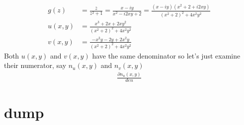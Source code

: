 \documentclass{article}
\begin{document}
		\begin{align*}
			g(z) &= \frac{\bar{z}}{z^2+1} = \frac{x-iy}{x^2 -i2xy + 2} = \frac{(x-iy)(x^2+2 +i2xy)}{(x^2+2 )^2 + 4x^2y^2}\\
			u(x,y) &= \frac{x^3 +2x + 2xy^2}{(x^2+2 )^2 + 4x^2y^2}\\
			v(x,y) &= \frac{-x^2y -2y +2x^2y}{(x^2+2 )^2 + 4x^2y^2}
		\end{align*}
		Both $u(x,y)$ and $v(x,y)$ have the same denominator so let's just examine their numerator, say $n_u(x,y)$ and $n_v(x,y)$
		\begin{align*}
			\frac{\partial n_u(x,y)}{den}
		\end{align*}
	
\clearpage
\section{dump}
	
	
	
	
	
\end{document}
